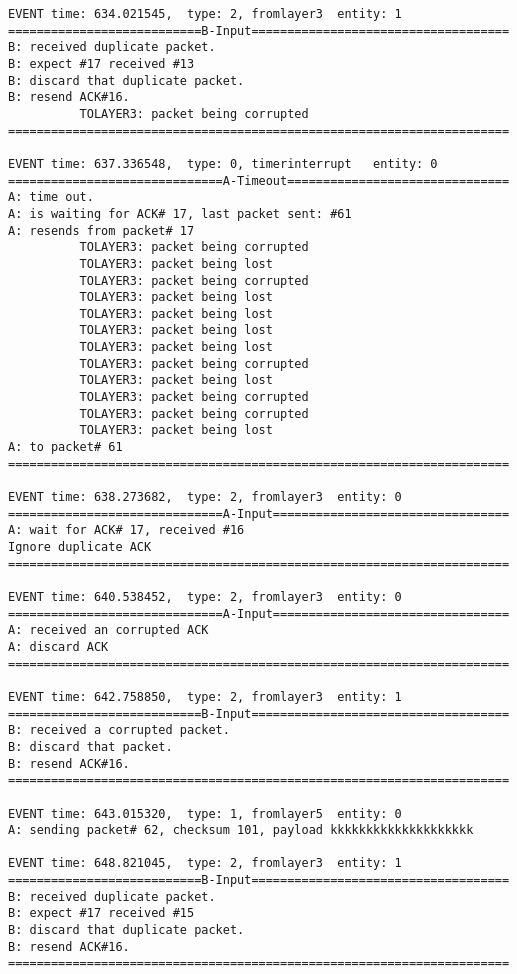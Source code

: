 \documentclass[12pt]{article}
\begin{document}
\begin{verbatim}
EVENT time: 634.021545,  type: 2, fromlayer3  entity: 1
===========================B-Input====================================
B: received duplicate packet.
B: expect #17 received #13
B: discard that duplicate packet.
B: resend ACK#16.
          TOLAYER3: packet being corrupted
======================================================================

EVENT time: 637.336548,  type: 0, timerinterrupt   entity: 0
==============================A-Timeout===============================
A: time out. 
A: is waiting for ACK# 17, last packet sent: #61
A: resends from packet# 17 
          TOLAYER3: packet being corrupted
          TOLAYER3: packet being lost
          TOLAYER3: packet being corrupted
          TOLAYER3: packet being lost
          TOLAYER3: packet being lost
          TOLAYER3: packet being lost
          TOLAYER3: packet being lost
          TOLAYER3: packet being corrupted
          TOLAYER3: packet being lost
          TOLAYER3: packet being corrupted
          TOLAYER3: packet being corrupted
          TOLAYER3: packet being lost
A: to packet# 61
======================================================================

EVENT time: 638.273682,  type: 2, fromlayer3  entity: 0
==============================A-Input=================================
A: wait for ACK# 17, received #16
Ignore duplicate ACK
======================================================================

EVENT time: 640.538452,  type: 2, fromlayer3  entity: 0
==============================A-Input=================================
A: received an corrupted ACK 
A: discard ACK
======================================================================

EVENT time: 642.758850,  type: 2, fromlayer3  entity: 1
===========================B-Input====================================
B: received a corrupted packet.
B: discard that packet.
B: resend ACK#16.
======================================================================

EVENT time: 643.015320,  type: 1, fromlayer5  entity: 0
A: sending packet# 62, checksum 101, payload kkkkkkkkkkkkkkkkkkkk

EVENT time: 648.821045,  type: 2, fromlayer3  entity: 1
===========================B-Input====================================
B: received duplicate packet.
B: expect #17 received #15
B: discard that duplicate packet.
B: resend ACK#16.
======================================================================


\end{verbatim}
\end{document}
